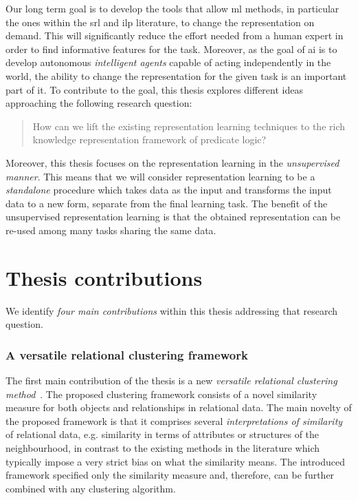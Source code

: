 Our long term goal is to develop the tools that allow \gls{ml} methods, in particular the ones within the \gls{srl} and \gls{ilp} literature, to change the representation on demand.
This will significantly reduce the effort needed from a human expert in order to find informative features for the task.
Moreover, as the goal of \gls{ai} is to develop autonomous \textit{intelligent agents} \cite{Russell:2009:AIM:1671238} capable of acting independently in the world, the ability to change the representation for the given task is an important part of it.
To contribute to the goal, this thesis explores different ideas approaching the following research question: 

\begin{quote}
	How can we lift the existing representation learning techniques to the rich knowledge representation framework of predicate logic?
\end{quote}


Moreover, this thesis focuses on the representation learning in the \textit{unsupervised manner}.
This means that we will consider representation learning to be a \textit{standalone} procedure which takes data as the input and transforms the input data to a new form, separate from the final learning task.
The benefit of the unsupervised representation learning is that the obtained representation can be re-used among many tasks sharing the same data.






\section{Thesis contributions}




We identify \textit{four main contributions} within this thesis addressing that research question.



\subsubsection{A versatile relational clustering framework}

The first main contribution of the thesis is a new \textit{versatile relational clustering method}~\cite{Dumancic2017a}.
The proposed clustering framework consists of a novel similarity measure for both objects and relationships in relational data.
The main novelty of the proposed framework is that it comprises several \textit{interpretations of similarity} of relational data, e.g. similarity in terms of attributes or structures of the neighbourhood, in contrast to the existing methods in the literature which typically impose a very strict bias on what the similarity means.
The introduced framework specified only the similarity measure and, therefore, can be further combined with any clustering algorithm.




